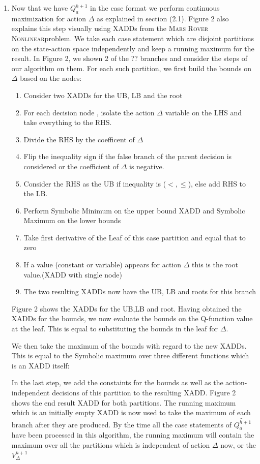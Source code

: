 \documentclass[letterpaper]{article}
\newcommand{\MarsRoverNL}{\textsc{Mars Rover Nonlinear}}
\begin{document}
\begin{enumerate}
\item Now that we have $Q_a^{h+1}$ in
the case format we perform continuous maximization for action $\Delta$ as explained in section (2.1). Figure 2 also explains this step visually using XADDs from the \MarsRoverNL problem. We take each case statement which are disjoint partitions on the state-action space independently and keep a running maximum for the result. In Figure 2, we shown 2 of the ??  branches and consider the steps of our algorithm on them.
For each such partition, we first build the bounds on $\Delta$ based on the nodes: 
\begin{enumerate}
\item Consider two XADDs for the UB, LB and the root
\item For each decision node , isolate the action $\Delta$ variable on the LHS and take everything to the RHS.
\item Divide the RHS by the coefficent of $\Delta$
\item Flip the inequality sign if the false branch of the parent decision is considered or the coefficient of $\Delta$ is negative. 
\item Consider the RHS as the UB if inequality is ($<, \leq$), else add RHS to the LB.
\item Perform Symbolic Minimum on the upper bound XADD and Symbolic Maximum on the lower bounds
\item Take first derivative of the Leaf of this case partition and equal that to zero
\item If a value (constant or variable) appears for action $\Delta$ this is the root value.(XADD with single node)
\item The two resulting XADDs now have the UB, LB and roots for this branch
\end{enumerate}


Figure 2 shows the XADDs for the UB,LB and root. Having obtained the XADDs for the bounds, we now evaluate the bounds on the Q-function value at the leaf. This is equal to substituting the bounds in the leaf for $\Delta$.

We then take the maximum of the bounds with regard to the new XADDs. This is equal to the Symbolic maximum over three different functions which is an XADD itself: 

In the last step, we add the constaints for the bounds as well as the action-independent decisions of this partition to the resulting XADD. Figure 2 shows the end result XADD for both partitions. The running maximum which is an initially empty XADD is now used to take the maximum of each branch after they are produced. By the time all the case statements of $ \tilde{Q_a^{h+1}}$ have been processed in this algorithm, the running maximum will contain the maximum over all the partitions which is independent of action $\Delta$ now, or the  $V_{\Delta}^{h+1}$


\end{enumerate}
\end{document}
